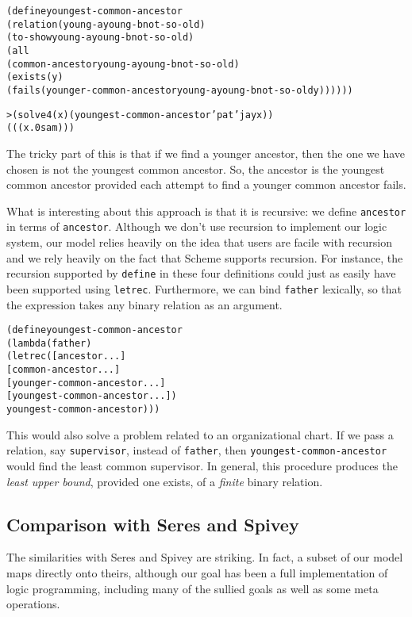 \begin{alltt}
(define youngest-common-ancestor
  (relation (young-a young-b not-so-old)
    (to-show young-a young-b not-so-old)
    (all
      (common-ancestor young-a young-b not-so-old)
      (exists (y)
        (fails (younger-common-ancestor young-a young-b not-so-old y))))))

> (solve 4 (x) (youngest-common-ancestor 'pat 'jay x))
(((x.0 sam)))
\end{alltt}

\noindent
The tricky part of this is that if we find a younger ancestor,
then the one we have chosen is not the youngest common ancestor.  So, the
ancestor is the youngest common ancestor provided each attempt to find
a younger common ancestor fails.

What is interesting about this approach is that it is recursive: we
define \texttt{ancestor} in terms of \texttt{ancestor}.  Although
we don't use recursion to implement our logic system, our model
relies heavily on the idea that users are facile with recursion
and we rely heavily on the fact that Scheme supports recursion.  For
instance, the recursion supported by \texttt{define} in these four
definitions could just as easily have been supported using
\texttt{letrec}.  Furthermore, we can bind \texttt{father} lexically,
so that the expression takes any binary relation as an argument.

\begin{alltt}
(define youngest-common-ancestor
  (lambda (father)
    (letrec ([ancestor ...]
             [common-ancestor ...]
             [younger-common-ancestor ...]
             [youngest-common-ancestor ...])
      youngest-common-ancestor)))
\end{alltt}

\noindent
This would also solve a problem related to an organizational chart.
If we pass a relation, say \texttt{supervisor}, instead of
\texttt{father}, then \texttt{youngest-common-ancestor} would find the
least common supervisor.  In general, this procedure produces the
\emph{least upper bound}, provided one exists, of a \emph{finite}
binary relation.

\subsection{Comparison with Seres and Spivey}
The similarities with Seres and Spivey are striking.  In fact, a
subset of our model maps directly onto theirs, although our goal
has been a full implementation of logic programming, including
many of the sullied goals as well as some meta operations.

